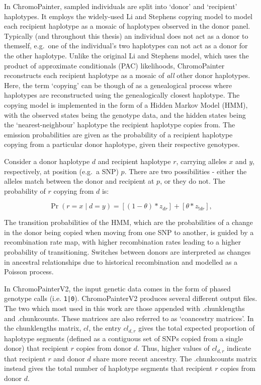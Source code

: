 In ChromoPainter, sampled individuals are split into `donor' and `recipient' haplotypes. It employs the widely-used Li and Stephens copying model \cite{Li2003} to model each recipient haplotype as a mosaic of haplotypes observed in the donor panel. Typically (and throughout this thesis) an individual does not act as a donor to themself, e.g.\ one of the individual's two haplotypes can not act as a donor for the other haplotype. Unlike the original Li and Stephens model, which uses the product of approximate conditionals (PAC) likelihoods, ChromoPainter reconstructs each recipient haplotype as a mosaic of \textit{all} other donor haplotypes. Here, the term `copying' can be though of as a genealogical process where haplotypes are reconstructed using the genealogically closest haplotype. The copying model is implemented in the form of a Hidden Markov Model (HMM), with the observed states being the genotype data, and the hidden states being the `nearest-neighbour' haplotype the recipient haplotype copies from. The emission probabilities are given as the probability of a recipient haplotype copying from a particular donor haplotype, given their respective genotypes. 

Consider a donor haplotype $d$ and recipient haplotype $r$, carrying alleles $x$ and $y$, respectively, at position (e.g.\ a SNP) $p$. There are two possibilities - either the alleles match between the donor and recipient at $p$, or they do not. The probability of $r$ copying from $d$ is: 

\begin{equation}
\Pr(r = x \mid d = y) = [(1-\theta) * z_{dr}] + [\theta * z_{!dr}],
\end{equation}


The transition probabilities of the HMM, which are the probabilities of a change in the donor being copied when moving from one SNP to another, is guided by a recombination rate map, with higher recombination rates leading to a higher probability of transitioning. Switches between donors are interpreted as changes in ancestral relationships due to historical recombination and modelled as a Poisson process. 

In ChromoPainterV2, the input genetic data comes in the form of phased genotype calls (i.e. \texttt{1|0}). ChromoPainterV2 produces several different output files. The two which most used in this work are those appended with .chunklengths and .chunkcounts. These matrices are also referred to as `coancestry matrices'. In the chunklengths matrix, $cl$, the entry $cl_{d,r}$ gives the total expected proportion of haplotype segments (defined as a contiguous set of SNPs copied from a single donor) that recipient $r$ copies from donor $d$. Thus, higher values of $cl_{d,r}$ indicate that recipient $r$ and donor $d$ share more recent ancestry. The .chunkcounts matrix instead gives the total number of haplotype segments that recipient $r$ copies from donor $d$.

